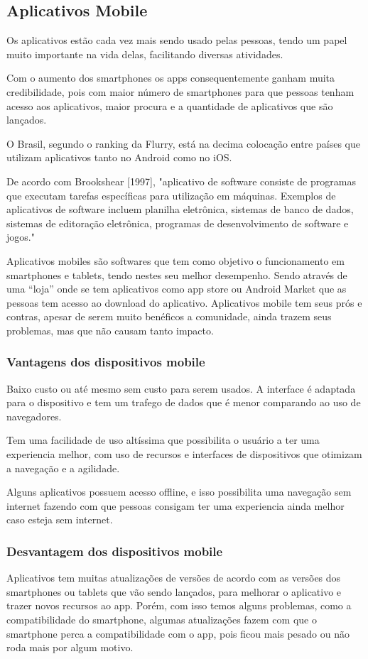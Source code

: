 \subsection{Aplicativos Mobile}
Os aplicativos estão cada vez mais sendo usado pelas pessoas, tendo um papel muito importante na vida delas, facilitando diversas atividades.

Com o aumento dos smartphones os apps consequentemente ganham muita credibilidade, pois com maior número de smartphones para que pessoas tenham acesso aos aplicativos, maior procura e a quantidade de aplicativos que são lançados.

O Brasil, segundo o ranking da Flurry, está na decima colocação entre países que utilizam aplicativos tanto no Android como no iOS.

De acordo com Brookshear [1997], "aplicativo de software consiste de programas que executam tarefas específicas para utilização em máquinas. Exemplos de aplicativos de software incluem planilha eletrônica, sistemas de banco de dados, sistemas de editoração eletrônica, programas de desenvolvimento de software e jogos."

Aplicativos mobiles são softwares que tem como objetivo o funcionamento em smartphones e tablets, tendo nestes seu melhor desempenho. Sendo através de uma “loja” onde se tem aplicativos como app store ou Android Market que as pessoas tem acesso ao download do aplicativo.
Aplicativos mobile tem seus prós e contras, apesar de serem muito benéficos a comunidade, ainda trazem seus problemas, mas que não causam tanto impacto.

\subsubsection{Vantagens dos dispositivos mobile}
Baixo custo ou até mesmo sem custo para serem usados. A interface é adaptada para o dispositivo e tem um trafego de dados que é menor comparando ao uso de navegadores.

Tem uma facilidade de uso altíssima que possibilita o usuário a ter uma experiencia melhor, com uso de recursos e interfaces de dispositivos que otimizam a navegação e a agilidade.

Alguns aplicativos possuem acesso offline, e isso possibilita uma navegação sem internet fazendo com que pessoas consigam ter uma experiencia ainda melhor caso esteja sem internet.

\subsubsection{Desvantagem dos dispositivos mobile}
Aplicativos tem muitas atualizações de versões de acordo com as versões dos smartphones ou tablets que vão sendo lançados, para melhorar o aplicativo e trazer novos recursos ao app. Porém, com isso temos alguns problemas, como a compatibilidade do smartphone, algumas atualizações fazem com que o smartphone perca a compatibilidade com o app, pois ficou mais pesado ou não roda mais por algum motivo.

